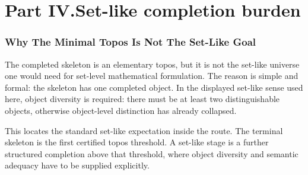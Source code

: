 \documentclass[11pt]{article}
\begin{document}
\part*{Part IV.\quad Set-like completion burden}

\section{Why The Minimal Topos Is Not The Set-Like Goal}

The completed skeleton is an elementary topos, but it is not the
set-like universe one would need for set-level mathematical formulation.
The reason is simple and formal: the skeleton has one completed object.
In the displayed set-like sense used here, object diversity is required:
there must be at least two distinguishable objects, otherwise
object-level distinction has already collapsed.

This locates the standard set-like expectation inside the route.  The
terminal skeleton is the first certified topos threshold.  A set-like
stage is a further structured completion above that threshold, where
object diversity and semantic adequacy have to be supplied explicitly.
\end{document}
